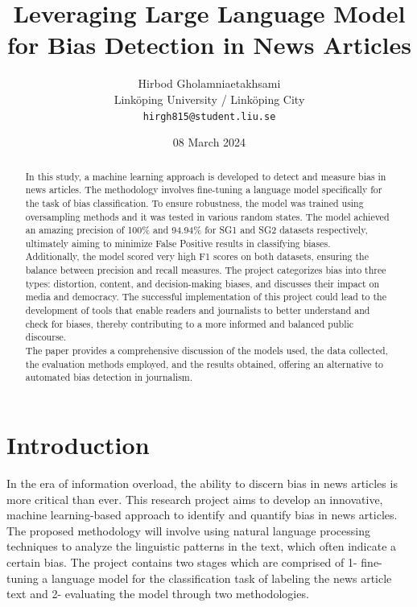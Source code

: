 \documentclass[11pt,a4paper]{article}
\title{Leveraging Large Language Model for Bias Detection in News Articles}
\author{Hirbod Gholamniaetakhsami \\
  Linköping University / Linköping City \\
  \texttt{hirgh815@student.liu.se}}
\date{08 March 2024}
\begin{document}
\maketitle
\begin{abstract}
In this study, a machine learning approach is developed to detect and measure bias in news articles. The methodology involves fine-tuning a language model specifically for the task of bias classification. To ensure robustness, the model was trained using oversampling methods and it was tested in various random states. The model achieved an amazing precision of 100\% and 94.94\% for SG1 and SG2 datasets respectively, ultimately aiming to minimize False Positive results in classifying biases.\\
Additionally, the model scored very high F1 scores on both datasets, ensuring the balance between precision and recall measures. The project categorizes bias into three types: distortion, content, and decision-making biases, and discusses their impact on media and democracy. The successful implementation of this project could lead to the development of tools that enable readers and journalists to better understand and check for biases, thereby contributing to a more informed and balanced public discourse.\\
The paper provides a comprehensive discussion of the models used, the data collected, the evaluation methods employed, and the results obtained, offering an alternative to automated bias detection in journalism.
\end{abstract}

\section{Introduction}

In the era of information overload, the ability to discern bias in news articles is more critical than ever. This research project aims to develop an innovative, machine learning-based approach to identify and quantify bias in news articles. The proposed methodology will involve using natural language processing techniques to analyze the linguistic patterns in the text, which often indicate a certain bias. The project contains two stages which are comprised of 1- fine-tuning a language model for the classification task of labeling the news article text and 2- evaluating the model through two methodologies. 
\end{document}
